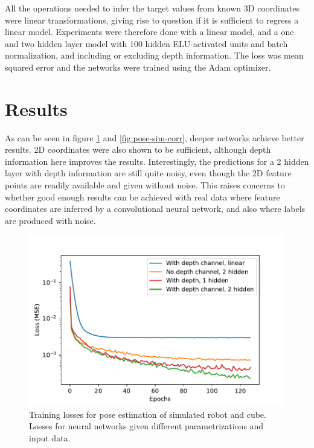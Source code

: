 All the operations needed to infer the target values from known 3D coordinates
were linear transformations, giving rise to question if it is sufficient to
regress a linear model. Experiments were therefore done with a linear model,
and a one and two hidden layer model with 100 hidden ELU-activated units and
batch normalization, and including or excluding depth information. The loss was
mean squared error and the networks were trained using the Adam optimizer.

\section{Results}

As can be seen in figure \ref{fig:pose-sim-losses} and \ref{fig:pose-sim-corr},
deeper networks achieve better results. 2D coordinates were also shown to be
sufficient, although depth information here improves the results.
Interestingly, the predictions for a 2 hidden layer with depth information are
still quite noisy, even though the 2D feature points are readily available and
given without noise. This raises concerns to whether good enough results can be
achieved with real data where feature coordinates are inferred by a
convolutional neural network, and also where labels are produced with noise.

\begin{figure}[h!]
    \centering
    \includegraphics[width=0.7 \textwidth]{res/pose_sim_losses.pdf}

    \caption{Training losses for pose estimation of simulated robot and cube.
    Losses for neural networks given different parametrizations and input
    data.}

    \label{fig:pose-sim-losses}
    
\end{figure}

